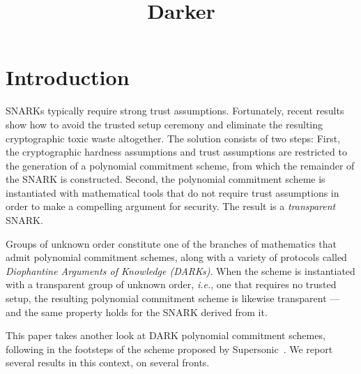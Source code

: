 \documentclass[11pt]{article}
\title{Darker}
\theoremstyle{Definition}
\begin{document}
	
\maketitle
\section{Introduction}
SNARKs typically require strong trust assumptions. Fortunately, recent results show how to avoid the trusted setup ceremony and eliminate the resulting cryptographic toxic waste altogether. The solution consists of two steps: First, the cryptographic hardness assumptions and trust assumptions are restricted to the generation of a polynomial commitment scheme, from which the remainder of the SNARK is constructed. Second, the polynomial commitment scheme is instantiated with mathematical tools that do not require trust assumptions in order to make a compelling argument for security. The result is a \emph{transparent} SNARK.

Groups of unknown order constitute one of the branches of mathematics that admit polynomial commitment schemes, along with a variety of protocols called \emph{Diophantine Arguments of Knowledge (DARKs)}. When the scheme is instantiated with a transparent group of unknown order, \emph{i.e.}, one that requires no trusted setup, the resulting polynomial commitment scheme is likewise transparent --- and the same property holds for the SNARK derived from it.

This paper takes another look at DARK polynomial commitment schemes, following in the footsteps of the scheme proposed by Supersonic~\cite{BFS20}. We report several results in this context, on several fronts.
\end{document}
